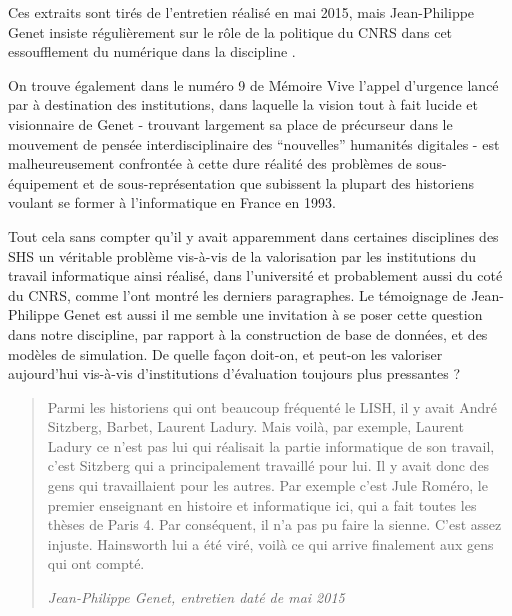 Ces extraits sont tirés de l'entretien réalisé en mai 2015, mais Jean-Philippe Genet insiste régulièrement sur le rôle de la politique du CNRS dans cet essoufflement du numérique dans la discipline .

On trouve également dans le numéro 9 de Mémoire Vive l'appel d'urgence lancé par \textcite{Genet1993} à destination des institutions, dans laquelle la vision tout à fait lucide et visionnaire de Genet - trouvant largement sa place de précurseur dans le mouvement de pensée interdisciplinaire des \enquote{nouvelles} humanités digitales  - est malheureusement confrontée à cette dure réalité des problèmes de sous-équipement et de sous-représentation que subissent la plupart des historiens voulant se former à l'informatique en France en 1993.

Tout cela sans compter qu'il y avait apparemment dans certaines disciplines des SHS un véritable problème vis-à-vis de la valorisation par les institutions du travail informatique ainsi réalisé, dans l'université et probablement aussi du coté du CNRS, comme l'ont montré les derniers paragraphes. Le témoignage de Jean-Philippe Genet est aussi il me semble une invitation à se poser cette question dans notre discipline, par rapport à la construction de base de données, et des modèles de simulation. De quelle façon doit-on, et peut-on les valoriser aujourd'hui vis-à-vis d'institutions d'évaluation toujours plus pressantes ?

\blockquote[\textit{Jean-Philippe Genet, entretien daté de mai 2015}]{Parmi les historiens qui ont beaucoup fréquenté le LISH, il y avait André Sitzberg, Barbet, Laurent Ladury. Mais voilà, par exemple, Laurent Ladury ce n'est pas lui qui réalisait la partie informatique de son travail, c'est Sitzberg qui a principalement travaillé pour lui. Il y avait donc des gens qui travaillaient pour les autres. Par exemple c'est Jule Roméro, le premier enseignant en histoire et informatique ici, qui a fait toutes les thèses de Paris 4. Par conséquent, il n'a pas pu faire la sienne. C'est assez injuste. Hainsworth lui a été viré, voilà ce qui arrive finalement aux gens qui ont compté.}

